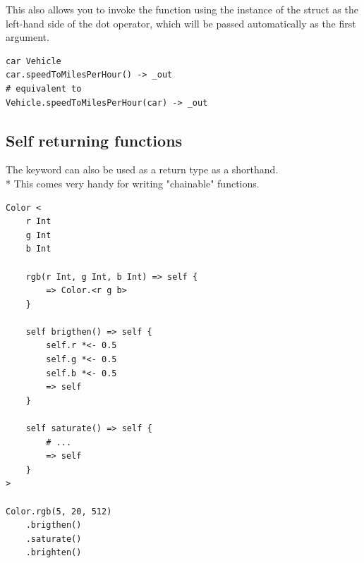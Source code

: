 This also allows you to invoke the function using the instance of the struct as
the left-hand side of the dot operator, which will be passed automatically as
the first argument.

\begin{verbatim}
car Vehicle
car.speedToMilesPerHour() -> _out
# equivalent to
Vehicle.speedToMilesPerHour(car) -> _out
\end{verbatim}

\subsection{Self returning functions}

The  keyword can also be used as a return type as a shorthand.\\*
This comes very handy for writing "chainable" functions.

\begin{verbatim}
Color <
	r Int
	g Int
	b Int

	rgb(r Int, g Int, b Int) => self {
		=> Color.<r g b>
	}

	self brigthen() => self {
		self.r *<- 0.5
		self.g *<- 0.5
		self.b *<- 0.5
		=> self
	}

	self saturate() => self {
		# ...
		=> self
	}
>

Color.rgb(5, 20, 512)
	.brigthen()
	.saturate()
	.brighten()
\end{verbatim}

